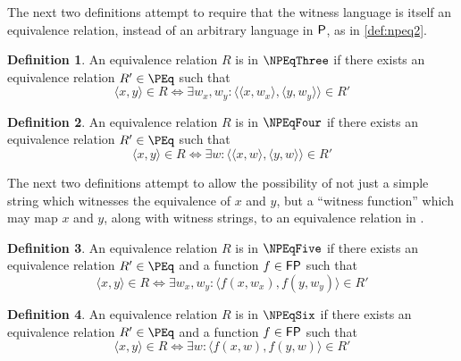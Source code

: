 \documentclass[draft]{article}
\theoremstyle{definition} \newtheorem{openproblem}[openproblem]{Open problem}
\theoremstyle{definition} \newtheorem{definition}[definition]{Definition}
\newcommand{\pair}[2]{\langle#1,#2\rangle} %
\begin{document}
The next two definitions attempt to require that the witness language is itself an equivalence relation, instead of an arbitrary language in $\P$, as in \autoref{def:npeq2}.
\begin{definition}\label{def:npeq3}
  An equivalence relation $R$ is in $\NPEqThree$ if there exists an equivalence relation $R'\in \PEq$ such that
  \begin{displaymath}
    \pair{x}{y}\in R\iff \exists w_x,w_y\colon \pair{\pair{x}{w_x}}{\pair{y}{w_y}}\in R'
  \end{displaymath}
\end{definition}
\begin{definition}\label{def:npeq4}
  An equivalence relation $R$ is in $\NPEqFour$ if there exists an equivalence relation $R'\in \PEq$ such that
  \begin{displaymath}
    \pair{x}{y}\in R\iff \exists w\colon \pair{\pair{x}{w}}{\pair{y}{w}}\in R'
  \end{displaymath}
\end{definition}

The next two definitions attempt to allow the possibility of not just a simple string which witnesses the equivalence of $x$ and $y$, but a ``witness function'' which may map $x$ and $y$, along with witness strings, to an equivalence relation in \PEq.
\begin{definition}\label{def:npeq5}
  An equivalence relation $R$ is in $\NPEqFive$ if there exists an equivalence relation $R'\in \PEq$ and a function $f\in\FP$ such that
  \begin{displaymath}
    \pair{x}{y}\in R\iff \exists w_x,w_y\colon \pair{f(x, w_x)}{f(y, w_y)}\in R'
  \end{displaymath}
\end{definition}
\begin{definition}\label{def:npeq6}
  An equivalence relation $R$ is in $\NPEqSix$ if there exists an equivalence relation $R'\in \PEq$ and a function $f\in\FP$ such that
  \begin{displaymath}
    \pair{x}{y}\in R\iff \exists w\colon \pair{f(x, w)}{f(y, w)}\in R'
  \end{displaymath}
\end{definition}
\end{document}
